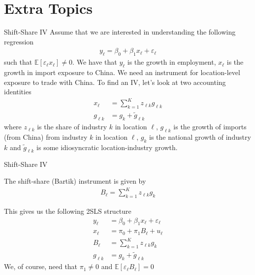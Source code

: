 \section{Extra Topics}

\begin{frame}{Shift-Share IV}
    Assume that we are interested in understanding the following regression
    \begin{align*}
        y_\ell = \beta_0 + \beta_1 x_\ell + \varepsilon_\ell
    \end{align*}
    such that $\mathbb{E}[\varepsilon_\ell x_\ell] \neq 0$. We have that $y_\ell$ is the growth in employment, $x_\ell$ is the growth in import exposure to China. We need an instrument for location-level exposure to trade with China. To find an IV, let's look at two accounting identities
    \begin{align*}
        x_\ell &= \sum_{k=1}^K z_{\ell k} g_{\ell k}
        \\
        g_{\ell k} &= g_k + \tilde{g}_{\ell k}
    \end{align*}
    where $z_{\ell k}$ is the share of industry $k$ in location $\ell$, $g_{\ell k}$ is the growth of imports (from China) from industry $k$ in location $\ell$, $g_k$ is the national growth of industry $k$ and $\tilde{g}_{\ell k}$ is some idiosyncratic location-industry growth.
\end{frame}

\begin{frame}{Shift-Share IV}

    The shift-share (Bartik) instrument is given by
    \begin{align*}
        B_\ell = \sum_{k=1}^K z_{\ell k} g_k
    \end{align*}

    This gives us the following 2SLS structure
    \begin{align*}
        y_\ell &= \beta_0 + \beta_1 x_\ell + \varepsilon_\ell
        \\
        x_\ell &= \pi_0 + \pi_1 B_\ell + u_\ell
        \\
        B_\ell &= \sum_{k=1}^K z_{\ell k} g_k
        \\
        g_{\ell k} &= g_k + \tilde{g}_{\ell k}
    \end{align*}
    We, of course, need that $\pi_1 \neq 0$ and $\mathbb{E}[\varepsilon_\ell B_\ell] = 0$
    
\end{frame}

